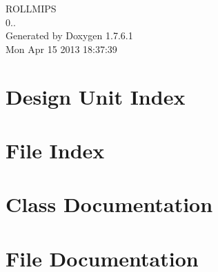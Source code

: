 \documentclass[a4paper]{book}
\begin{document}
\hypersetup{pageanchor=false,citecolor=blue}
\begin{titlepage}
\vspace*{7cm}
\begin{center}
{\Large \-R\-O\-L\-L\-M\-I\-P\-S \\[1ex]\large 0.. }\\
\vspace*{1cm}
{\large \-Generated by Doxygen 1.7.6.1}\\
\vspace*{0.5cm}
{\small Mon Apr 15 2013 18:37:39}\\
\end{center}
\end{titlepage}
\clearemptydoublepage
{}
\tableofcontents
\clearemptydoublepage
{}
\hypersetup{pageanchor=true,citecolor=blue}
\chapter{\-Design \-Unit \-Index}

\chapter{\-File \-Index}

\chapter{\-Class \-Documentation}














































\chapter{\-File \-Documentation}


\printindex
\end{document}
